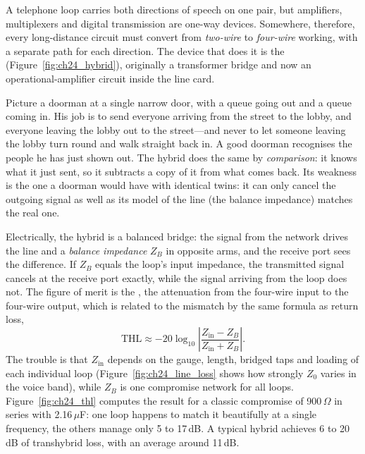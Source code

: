 A telephone loop carries both directions of speech on one pair, but amplifiers, multiplexers and
digital transmission are one-way devices. Somewhere, therefore, every long-distance circuit must
convert from \emph{two-wire} to \emph{four-wire} working, with a separate path for each direction.
The device that does it is the  (Figure~\ref{fig:ch24_hybrid}), originally a
transformer bridge and now an operational-amplifier circuit inside the line card.


\begin{analogy}
Picture a doorman at a single narrow door, with a queue going out and a queue coming in. His job is
to send everyone arriving from the street to the lobby, and everyone leaving the lobby out to the
street---and never to let someone leaving the lobby turn round and walk straight back in. A good
doorman recognises the people he has just shown out. The hybrid does the same by \emph{comparison}:
it knows what it just sent, so it subtracts a copy of it from what comes back. Its weakness is
the one a doorman would have with identical twins: it can only cancel the outgoing signal as well
as its model of the line (the balance impedance) matches the real one.
\end{analogy}

Electrically, the hybrid is a balanced bridge: the signal from the network drives the line and a
\emph{balance impedance} $Z_B$ in opposite arms, and the receive port sees the difference. If $Z_B$
equals the loop's input impedance, the transmitted signal cancels at the receive port exactly, while
the signal arriving from the loop does not. The figure of merit is the , the
attenuation from the four-wire input to the four-wire output, which is related to the mismatch by
the same formula as return loss,
\begin{equation}
\text{THL}\approx-20\log_{10}\left|\frac{Z_{\text{in}}-Z_B}{Z_{\text{in}}+Z_B}\right|.
\end{equation}
The trouble is that $Z_{\text{in}}$ depends on the gauge, length, bridged taps and loading of each
individual loop (Figure~\ref{fig:ch24_line_loss} shows how strongly $Z_0$ varies in the voice
band), while $Z_B$ is one compromise network for all loops. Figure~\ref{fig:ch24_thl} computes the
result for a classic compromise of 900\,$\Omega$ in series with 2.16\,$\mu$F: one loop happens to
match it beautifully at a single frequency, the others manage only 5 to 17\,dB. A typical hybrid
achieves 6 to 20\,dB of transhybrid loss, with an average around 11\,dB.



